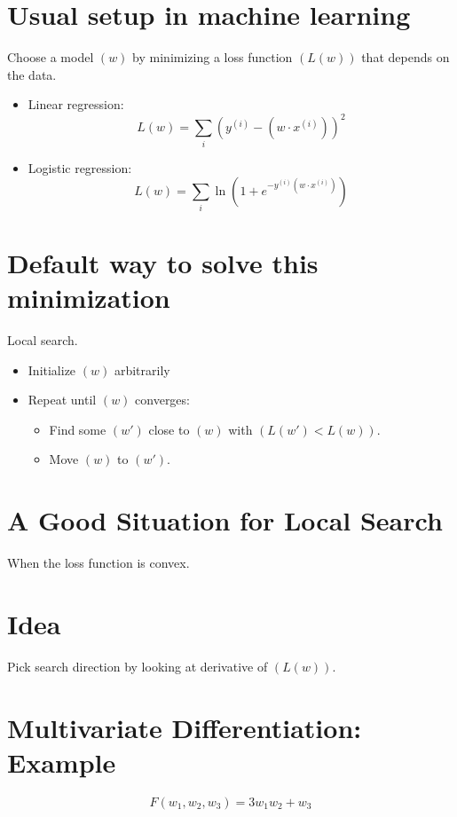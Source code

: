 \documentclass{article}
\begin{document}
\section*{Usual setup in machine learning}
Choose a model $( w )$ by minimizing a loss function $( L(w) )$ that depends on the data.

\begin{itemize}
    \item Linear regression:
    \begin{equation}
    L(w) = \sum_{i} \left(y^{(i)} - \left(w \cdot x^{(i)}\right)\right)^{2}
    \end{equation}
    \item Logistic regression:
    \begin{equation}
    L(w) = \sum_{i} \ln \left(1 + e^{-y^{(i)}\left(w \cdot x^{(i)}\right)}\right)
    \end{equation}
\end{itemize}

\section*{Default way to solve this minimization}
Local search.

\begin{itemize}
    \item Initialize $( w )$ arbitrarily
    \item Repeat until $( w )$ converges:
    \begin{itemize}
        \item Find some $( w' )$ close to $( w )$ with $( L(w') < L(w) )$.
        \item Move $( w )$ to $( w' )$.
    \end{itemize}
\end{itemize}

\section*{A Good Situation for Local Search}
When the loss function is convex.

\section*{Idea}
Pick search direction by looking at derivative of $( L(w) )$.

\section*{Multivariate Differentiation: Example}
\begin{equation}
F\left(w_{1}, w_{2}, w_{3}\right) = 3 w_{1} w_{2} + w_{3}
\end{equation}
\end{document}
